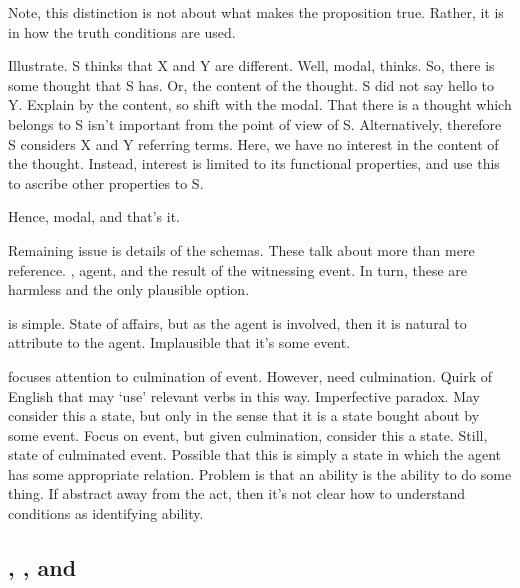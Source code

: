 \begin{note}[Exhaustive]
  Note, this distinction is not about what makes the proposition true.
  Rather, it is in how the truth conditions are used.

  Illustrate.
  S thinks that X and Y are different.
  Well, modal, thinks.
  So, there is some thought that S has.
  Or, the content of the thought.
  S did not say hello to Y.
  Explain by the content, so shift with the modal.
  That there is a thought which belongs to S isn't important from the point of view of S.
  Alternatively, therefore S considers X and Y referring terms.
  Here, we have no interest in the content of the thought.
  Instead, interest is limited to its functional properties, and use this to ascribe other properties to S.

  Hence, modal, and that's it.

  Remaining issue is details of the schemas.
  These talk about more than mere reference.
  \AR{}, agent, and \WR{} the result of the witnessing event.
  In turn, these are harmless and the only plausible option.

  \AR{} is simple.
  State of affairs, but as the agent is involved, then it is natural to attribute to the agent.
  Implausible that it's some event.

  \WR{} focuses attention to culmination of event.
  However, need culmination.
  Quirk of English that may `use' relevant verbs in this way.
  Imperfective paradox.
  May consider this a state, but only in the sense that it is a state bought about by some event.
  Focus on event, but given culmination, consider this a state.
  Still, state of culminated event.
  Possible that this is simply a state in which the agent has some appropriate relation.
  Problem is that an ability is the ability to do some thing.
  If abstract away from the act, then it's not clear how to understand conditions as identifying ability.
\end{note}

\subsection{\ESU{}, \gsi{}, and \WR{}}
\label{sec:first-conditional}

